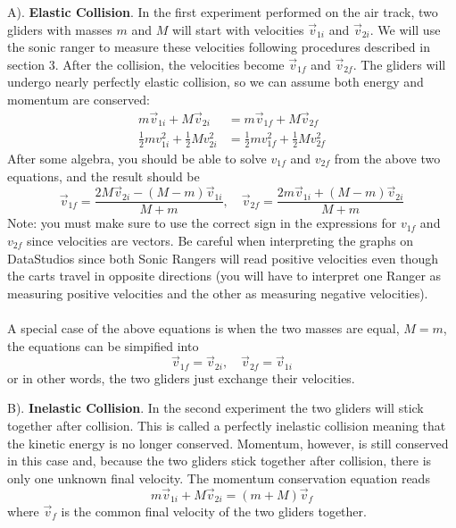 A). \textbf{Elastic Collision}. In the first experiment performed on the air track, two gliders with masses $m$ and $M$ will start with velocities $\vec v_{1i}$ and $\vec v_{2i}$. We will use the sonic ranger to measure these velocities following procedures described in section 3. After the collision, the velocities become $\vec v_{1f}$ and $\vec v_{2f}$. The gliders will undergo nearly perfectly elastic collision, so we can assume both energy and momentum are conserved:
\begin{align}
    m\vec v_{1i} + M\vec v_{2i} &=  m\vec v_{1f} + M\vec v_{2f} \\
    \frac{1}{2}mv_{1i}^2 + \frac{1}{2}Mv_{2i}^2 &= \frac{1}{2}mv_{1f}^2 + \frac{1}{2}Mv_{2f}^2
\end{align}
After some algebra, you should be able to solve $v_{1f}$ and $v_{2f}$ from the above two equations, and the result should be
\begin{equation}
   \vec  v_{1f} = \frac{2M \vec v_{2i} - (M-m)\vec v_{1i}}{M+m},\quad \vec v_{2f} = \frac{2m \vec v_{1i} + (M-m)\vec v_{2i}}{M+m}
  \label{eq:velocities}
\end{equation}
Note: you must make sure to use the correct sign in the expressions for $v_{1f}$ and $v_{2f}$ since velocities are vectors. Be careful when interpreting the graphs on DataStudios since both Sonic Rangers will read positive velocities even though the carts travel in opposite directions (you will have to interpret one Ranger as measuring positive velocities and the other as measuring negative velocities).
\\
\\
A special case of the above equations is when the two masses are equal, $M=m$, the equations can be simpified into
\begin{equation}
  \vec  v_{1f} = \vec v_{2i},\quad \vec v_{2f} = \vec v_{1i}
\end{equation}
or in other words, the two gliders just exchange their velocities.
\myskip

B). \textbf{Inelastic Collision}. In the second experiment the two gliders will stick together after collision. This is called a perfectly inelastic collision meaning that the kinetic energy is no longer conserved. Momentum, however, is still conserved in this case and, because the two gliders stick together after collision, there is only one unknown final velocity. The momentum conservation equation reads
\begin{equation}
    m\vec v_{1i} + M\vec v_{2i} = (m+M)\vec v_f
\end{equation}
where $\vec v_f$ is the common final velocity of the two gliders together.

